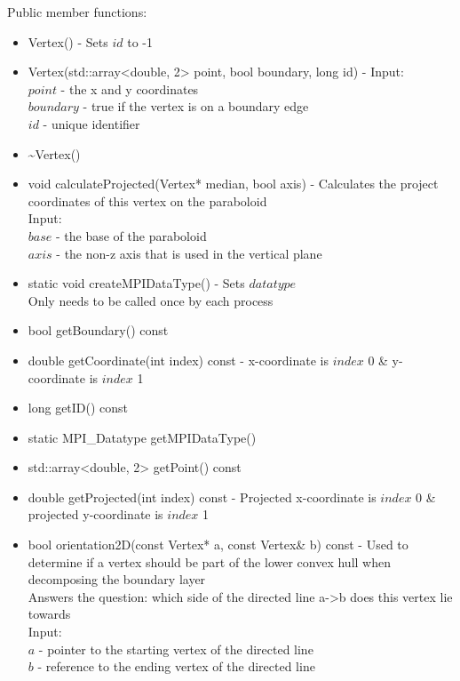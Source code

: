 \documentclass[manuscript, screen]{acmart}
\begin{document}
Public member functions:
\begin{itemize}
\item Vertex() - Sets $id$ to -1

\item Vertex(std::array<double, 2> point, bool boundary, long id) - Input:\\
$point$ - the x and y coordinates\\
$boundary$ - true if the vertex is on a boundary edge\\
$id$ - unique identifier

\item \textasciitilde{}Vertex()
%

\item void calculateProjected(Vertex* median, bool axis) - Calculates the project coordinates of this vertex on the paraboloid\\
Input:\\
$base$ - the base of the paraboloid\\
$axis$ - the non-z axis that is used in the vertical plane

\item static void createMPIDataType() - Sets $datatype$\\
Only needs to be called once by each process

\item bool getBoundary() const

\item double getCoordinate(int index) const - x-coordinate is $index$ 0 \& y-coordinate is $index$ 1

\item long getID() const

\item static MPI\_Datatype getMPIDataType()

\item std::array<double, 2> getPoint() const

\item double getProjected(int index) const - Projected x-coordinate is $index$ 0 \& projected y-coordinate is $index$ 1

\item bool orientation2D(const Vertex* a, const Vertex\& b) const - Used to determine if a vertex should be part of the lower convex hull when decomposing the boundary layer\\
Answers the question: which side of the directed line a->b does this vertex lie towards\\
Input:\\
$a$ - pointer to the starting vertex of the directed line\\
$b$ - reference to the ending vertex of the directed line


\end{itemize}
\end{document}
